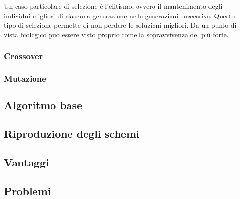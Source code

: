 \documentclass[12pt,a4paper]{article}
\begin{document}
Un caso particolare di selezione è l'elitismo, ovvero il mantenimento degli individui migliori di ciascuna generazione nelle generazioni successive. Questo tipo di selezione permette di non perdere le soluzioni migliori. Da un punto di vista biologico può essere visto proprio come la sopravvivenza del più forte.

\subsubsection{Crossover}

\subsubsection{Mutazione}

\subsection{Algoritmo base}

\subsection{Riproduzione degli schemi}

\subsection{Vantaggi}

\subsection{Problemi}
\newpage
\end{document}

